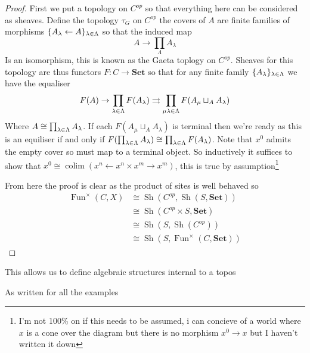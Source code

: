 \documentclass{article}
\begin{document}
\begin{proof}
    First we put a topology on $C^{op}$ so that everything here can be considered as sheaves. Define the topology $\tau_G$ on $C^{op}$ the covers of $A$ are finite families of morphisms $\{A_\lambda \leftarrow A\}_{{\lambda \in \Lambda}}$ so that the induced map 
    \[
    A \to \prod_\Lambda A_\lambda
    \]
    Is an isomorphism, this is known as the Gaeta toplogy on $C^{op}$. Sheaves for this topology are thus functors $F \colon C \to \mathbf{Set}$ so that for any finite family $\{A_\lambda\}_{\lambda \in \Lambda}$ we have the equaliser
    \[
F(A) \to \prod_{{\lambda \in \Lambda}}F(A_\lambda) \rightrightarrows \prod_{\mu {\lambda \in \Lambda}} F(A_\mu \sqcup_A A_\lambda)
    \]
Where $A \cong \prod_{\lambda \in \Lambda} A_\lambda$. If each $F(A_\mu \sqcup_A A_\lambda)$ is terminal then we're ready as this is an equiliser if and only if $F(\prod_{\lambda \in \Lambda} A_\lambda) \cong \prod_{{\lambda \in \Lambda}}F(A_\lambda)$. Note that $x^0$ admits the empty cover so must map to a terminal object. So inductively it suffices to show that $x^0 \cong \operatorname{colim}(x^n \leftarrow x^n \times x^m \rightarrow x^m)$, this is true by assumption\footnote{I'm not 100\% on if this needs to be assumed, i can concieve of a world where $x$ is a cone over the diagram but there is no morphism $x^0 \to x$ but I haven't written it down}

From here the proof is clear as the product of sites is well behaved so 
\begin{align*}
    \operatorname{Fun}^\times(C,X) &\cong \operatorname{Sh}(C^{op},\operatorname{Sh}(S,\mathbf{Set})) \\
    &\cong \operatorname{Sh}(C^{op} \times S,\mathbf{Set}) \\
    &\cong \operatorname{Sh}(S,\operatorname{Sh}(C^{op})) \\
    &\cong \operatorname{Sh}(S,\operatorname{Fun}^\times(C,\mathbf{Set}))
\end{align*}
\end{proof}
This allows us to define algebraic structures internal to a topos
\begin{lemma}
    As written for all the examples
\end{lemma}
\end{document}
